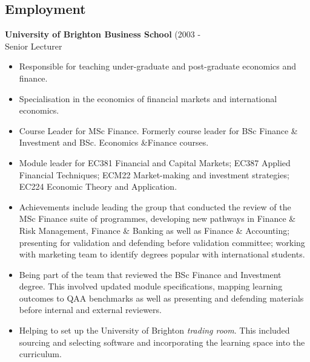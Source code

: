 \documentclass[margin,11pt]{res} %
\begin{document}

\address{{\bf 68 Osborne Villas} \\  Brighton \\ East Sussex \\ BN3 2RB\\
        (0)1273 726 154}


\begin{resume}


\section{Employment}  
     {\bf University of Brighton Business School}  (2003 - \\
     Senior Lecturer\\
\begin{itemize}
\item Responsible for teaching under-graduate and post-graduate economics and finance.  
\item Specialisation in the economics of financial markets and international economics.   
\item Course Leader for MSc Finance.  Formerly course leader for  BSc Finance \& Investment and BSc. Economics \&Finance courses.  
\item Module leader for EC381 Financial and Capital Markets; EC387 Applied Financial Techniques; ECM22 Market-making and investment strategies; EC224 Economic Theory and Application.
\item Achievements include leading the group that conducted the review of the MSc Finance suite of programmes, developing new pathways in Finance \& Risk Management, Finance \& Banking as well as Finance \& Accounting; presenting for validation and defending before validation committee; working with marketing team to identify degrees popular with international students.  
\item Being part of the team that reviewed the BSc Finance and Investment degree.  This involved updated module specifications, mapping learning outcomes to QAA benchmarks as well as presenting and defending materials before internal and external reviewers.  
\item Helping to set up the University of Brighton \emph{trading room}.  This included sourcing and selecting software and incorporating the learning space into the curriculum. 
\end{itemize}


\end{resume}
\end{document}
